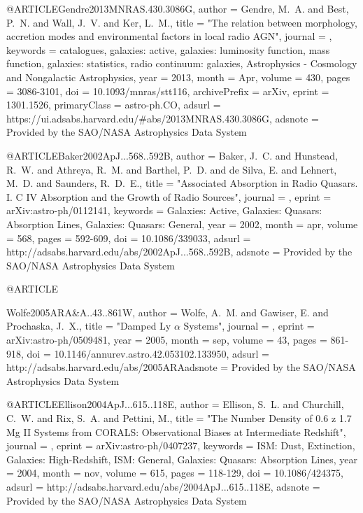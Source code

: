 \documentclass[twocolumn]{aastex62}
\begin{document}
{{{{{{{{{{{{{{{@ARTICLE{Gendre2013MNRAS.430.3086G,
       author = {{Gendre}, M.~A. and {Best}, P.~N. and {Wall}, J.~V. and {Ker}, L.~M.},
        title = "{The relation between morphology, accretion modes and environmental
        factors in local radio AGN}",
      journal = {\mnras},
     keywords = {catalogues, galaxies: active, galaxies: luminosity function, mass
        function, galaxies: statistics, radio continuum: galaxies,
        Astrophysics - Cosmology and Nongalactic Astrophysics},
         year = 2013,
        month = Apr,
       volume = {430},
        pages = {3086-3101},
          doi = {10.1093/mnras/stt116},
archivePrefix = {arXiv},
       eprint = {1301.1526},
 primaryClass = {astro-ph.CO},
       adsurl = {https://ui.adsabs.harvard.edu/#abs/2013MNRAS.430.3086G},
      adsnote = {Provided by the SAO/NASA Astrophysics Data System}
}


@ARTICLE{Baker2002ApJ...568..592B,
   author = {{Baker}, J.~C. and {Hunstead}, R.~W. and {Athreya}, R.~M. and 
	{Barthel}, P.~D. and {de Silva}, E. and {Lehnert}, M.~D. and 
	{Saunders}, R.~D.~E.},
    title = "{Associated Absorption in Radio Quasars. I. C IV Absorption and the Growth of Radio Sources}",
  journal = {\apj},
   eprint = {arXiv:astro-ph/0112141},
 keywords = {Galaxies: Active, Galaxies: Quasars: Absorption Lines, Galaxies: Quasars: General},
     year = 2002,
    month = apr,
   volume = 568,
    pages = {592-609},
      doi = {10.1086/339033},
   adsurl = {http://adsabs.harvard.edu/abs/2002ApJ...568..592B},
  adsnote = {Provided by the SAO/NASA Astrophysics Data System}
}

@ARTICLE{Wolfe2005ARA&A..43..861W,
   author = {{Wolfe}, A.~M. and {Gawiser}, E. and {Prochaska}, J.~X.},
    title = "{Damped Ly {$\alpha$} Systems}",
  journal = {\araa},
   eprint = {arXiv:astro-ph/0509481},
     year = 2005,
    month = sep,
   volume = 43,
    pages = {861-918},
      doi = {10.1146/annurev.astro.42.053102.133950},
   adsurl = {http://adsabs.harvard.edu/abs/2005ARAadsnote = {Provided by the SAO/NASA Astrophysics Data System}
}


@ARTICLE{Ellison2004ApJ...615..118E,
   author = {{Ellison}, S.~L. and {Churchill}, C.~W. and {Rix}, S.~A. and 
	{Pettini}, M.},
    title = "{The Number Density of 0.6 {\lt} z {\lt} 1.7 Mg II Systems from CORALS: Observational Biases at Intermediate Redshift}",
  journal = {\apj},
   eprint = {arXiv:astro-ph/0407237},
 keywords = {ISM: Dust, Extinction, Galaxies: High-Redshift, ISM: General, Galaxies: Quasars: Absorption Lines},
     year = 2004,
    month = nov,
   volume = 615,
    pages = {118-129},
      doi = {10.1086/424375},
   adsurl = {http://adsabs.harvard.edu/abs/2004ApJ...615..118E},
  adsnote = {Provided by the SAO/NASA Astrophysics Data System}
}


}}}}}}}}}}}}}}}}
\end{document}
